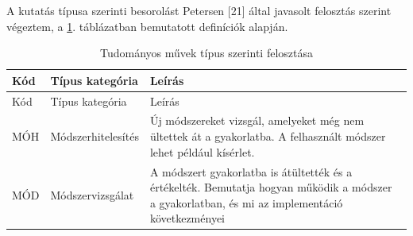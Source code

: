 \documentclass[12pt,magyar,a4paper,oneside]{scrreprt}
\begin{document}
A kutatás típusa szerinti besorolást Petersen {[}21{]} által javasolt
felosztás szerint végeztem, a \ref{tbl:SMSResKat}. táblázatban
bemutatott definíciók alapján.

\hypertarget{tbl:SMSResKat}{}
\begin{longtable}[]{@{}lll@{}}
\caption{\label{tbl:SMSResKat}Tudományos művek típus szerinti
felosztása}\tabularnewline
\toprule
\begin{minipage}[b]{0.05\columnwidth}\raggedright
Kód\strut
\end{minipage} & \begin{minipage}[b]{0.34\columnwidth}\raggedright
Típus kategória\strut
\end{minipage} & \begin{minipage}[b]{0.52\columnwidth}\raggedright
Leírás\strut
\end{minipage}\tabularnewline
\midrule
\endfirsthead
\toprule
\begin{minipage}[b]{0.05\columnwidth}\raggedright
Kód\strut
\end{minipage} & \begin{minipage}[b]{0.34\columnwidth}\raggedright
Típus kategória\strut
\end{minipage} & \begin{minipage}[b]{0.52\columnwidth}\raggedright
Leírás\strut
\end{minipage}\tabularnewline
\midrule
\endhead
\begin{minipage}[t]{0.05\columnwidth}\raggedright
MÓH\strut
\end{minipage} & \begin{minipage}[t]{0.34\columnwidth}\raggedright
Módszerhitelesítés\strut
\end{minipage} & \begin{minipage}[t]{0.52\columnwidth}\raggedright
Új módszereket vizsgál, amelyeket még nem ültettek át a gyakorlatba. A
felhasznált módszer lehet például kísérlet.\strut
\end{minipage}\tabularnewline
\begin{minipage}[t]{0.05\columnwidth}\raggedright
MÓD\strut
\end{minipage} & \begin{minipage}[t]{0.34\columnwidth}\raggedright
Módszervizsgálat\strut
\end{minipage} & \begin{minipage}[t]{0.52\columnwidth}\raggedright
A módszert gyakorlatba is átültették és a értékelték. Bemutatja hogyan
működik a módszer a gyakorlatban, és mi az implementáció következményei

\end{minipage}
\end{longtable}
\end{document}
